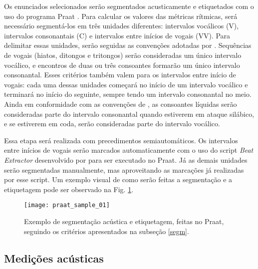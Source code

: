 \documentclass[
	a4paper,	%
	12pt,		%
	]{article}	%
\begin{document}
Os enunciados selecionados serão segmentados acusticamente e etiquetados com
o uso do programa Praat \citep{Boersma.Weenink2019}. Para calcular os
valores das métricas rítmicas, será necessário segmentá-los em três unidades
diferentes: intervalos vocálicos (V), intervalos consonantais (C) e
intervalos entre inícios de vogais (VV). Para delimitar essas unidades,
serão seguidas as convenções adotadas por \citet{Ramus.etal1999}.
Sequências de vogais (hiatos, ditongos e tritongos) serão consideradas um
único intervalo vocálico, e encontros de duas ou três consoantes formarão um
único intervalo consonantal. Esses critérios também valem para os intervalos
entre início de vogais: cada uma dessas unidades começará no início de um
intervalo vocálico e terminará no início do seguinte, sempre tendo um
intervalo consonantal no meio. Ainda em conformidade com as convenções de
\citet{Ramus.etal1999}, as consoantes líquidas serão consideradas parte do
intervalo consonantal quando estiverem em ataque silábico, e se estiverem em
coda, serão consideradas parte do intervalo vocálico.

Essa etapa será realizada com precedimentos semiautomáticos. Os intervalos
entre inícios de vogais serão marcados automaticamente com o uso do script
\emph{Beat Extractor} desenvolvido por \citet{Barbosa2016} para ser
executado no Praat. Já as demais unidades serão segmentadas manualmente, mas
aproveitando as marcações já realizadas por esse script. Um exemplo visual
de como serão feitas a segmentação e a etiquetagem pode ser observado na
Fig. \ref{praat}.

\begin{figure}[h]
	\vspace{1em}
	\caption{Exemplo de segmentação acústica e etiquetagem, feitas no Praat,
		seguindo os critérios apresentados na subseção \ref{segm}.}
	\label{praat}
	\centering
	\texttt{[image: praat\_sample\_01]}
\end{figure}
		
\subsection{Medições acústicas} \label{medicoes}
\end{document}
